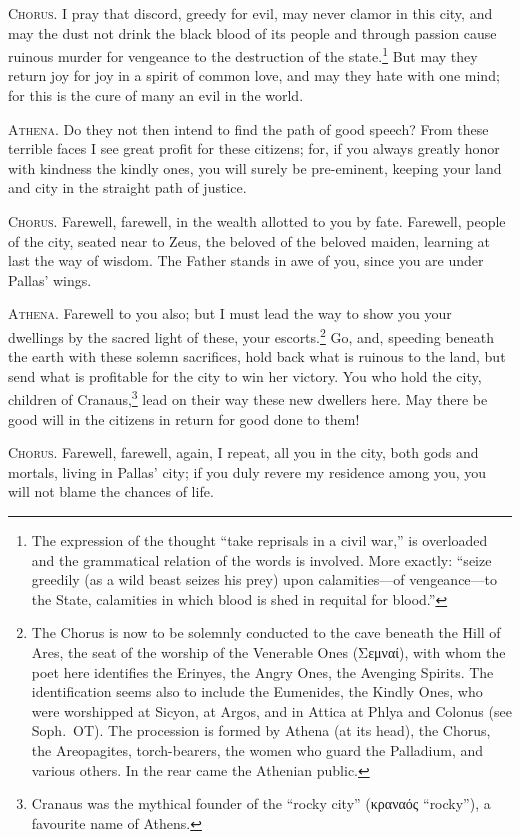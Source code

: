 \documentclass[12pt]{article}
\begin{document}
\textsc{Chorus.} I pray that discord, greedy for evil, may never clamor in this city, and may the dust not drink the black blood of its people and through passion cause ruinous murder for vengeance to the destruction of the state.\footnote{The expression of the thought ``take reprisals in a civil war,'' is overloaded and the grammatical relation of the words is involved. More exactly: ``seize greedily (as a wild beast seizes his prey) upon calamities---of vengeance---to the State, calamities in which blood is shed in requital for blood.''} But may they return joy for joy in a spirit of common love, and may they hate with one mind; for this is the cure of many an evil in the world.

\textsc{Athena.} Do they not then intend to find the path of good speech? From these terrible faces I see great profit for these citizens; for, if you always greatly honor with kindness the kindly ones, you will surely be pre-eminent, keeping your land and city in the straight path of justice.

\textsc{Chorus.} Farewell, farewell, in the wealth allotted to you by fate. Farewell, people of the city, seated near to Zeus, the beloved of the beloved maiden, learning at last the way of wisdom. The Father stands in awe of you, since you are under Pallas' wings.

\textsc{Athena.} Farewell to you also; but I must lead the way to show you your dwellings by the sacred light of these, your escorts.\footnote{The Chorus is now to be solemnly conducted to the cave beneath the Hill of Ares, the seat of the worship of the Venerable Ones (Σεμναί), with whom the poet here identifies the Erinyes, the Angry Ones, the Avenging Spirits. The identification seems also to include the Eumenides, the Kindly Ones, who were worshipped at Sicyon, at Argos, and in Attica at Phlya and Colonus (see Soph.~OT). The procession is formed by Athena (at its head), the Chorus, the Areopagites, torch-bearers, the women who guard the Palladium, and various others. In the rear came the Athenian public.} Go, and, speeding beneath the earth with these solemn sacrifices, hold back what is ruinous to the land, but send what is profitable for the city to win her victory. You who hold the city, children of Cranaus,\footnote{Cranaus was the mythical founder of the ``rocky city'' (κραναός ``rocky''), a favourite name of Athens.} lead on their way these new dwellers here. May there be good will in the citizens in return for good done to them!

\textsc{Chorus.} Farewell, farewell, again, I repeat, all you in the city, both gods and mortals, living in Pallas' city; if you duly revere my residence among you, you will not blame the chances of life.
\end{document}
